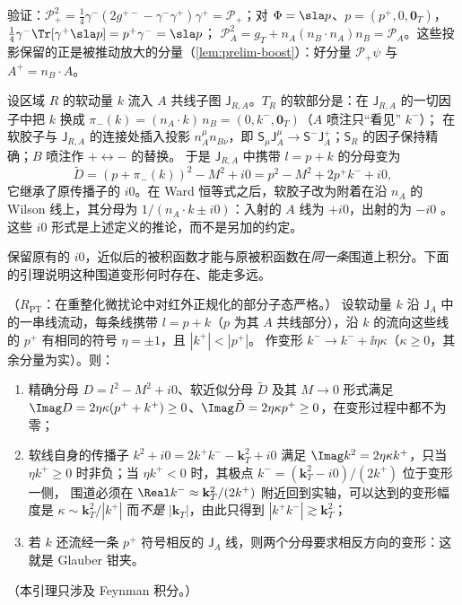 验证：$\mathcal P_+^2=\frac14\gamma^-(2g^{+-}-\gamma^-\gamma^+)\gamma^+=\mathcal P_+$；对 $\Phi=\sla p$、$p=(p^+,0,\mathbf 0_T)$，$\frac14\gamma^-\Tr[\gamma^+\sla p]=p^+\gamma^-=\sla p$；
$\mathcal P_A^2=g_T+n_A(n_B\cdot n_A)n_B=\mathcal P_A$。这些投影保留的正是被推动放大的分量（\cref{lem:prelim-boost}）：好分量 $\mathcal P_+\psi$ 与 $A^+=n_B\cdot A$。

\begin{definition}\label{def:method-soft-approx}
设区域 $R$ 的软动量 $k$ 流入 $A$ 共线子图 $\mathsf J_{R,A}$。$T_R$ 的软部分是：在 $\mathsf J_{R,A}$ 的一切因子中把 $k$ 换成 $\pi_-(k)=(n_A\cdot k)\,n_B=(0,k^-,\mathbf 0_T)$（$A$ 喷注只“看见” $k^-$）；
在软胶子与 $\mathsf J_{R,A}$ 的连接处插入投影 $n_A^\mu n_{B\nu}$，即 $\mathsf S_\mu\mathsf J_A^\mu\to\mathsf S^-\mathsf J_A^+$；$\mathsf S_R$ 的因子保持精确；$B$ 喷注作 $+\leftrightarrow-$ 的替换。
于是 $\mathsf J_{R,A}$ 中携带 $l=p+k$ 的分母变为
\begin{equation}\label{eq:method-Dtilde}
\tilde D=(p+\pi_-(k))^2-M^2+i0=p^2-M^2+2p^+k^-+i0 ,
\end{equation}
它继承了原传播子的 $i0$。在 Ward 恒等式之后，软胶子改为附着在沿 $n_A$ 的 Wilson 线上，其分母为 $1/(n_A\cdot k\pm i0)$：入射的 $A$ 线为 $+i0$，出射的为 $-i0$
。这些 $i0$ 形式是上述定义的推论，而不是另加的约定。%
\end{definition}

保留原有的 $i0$，近似后的被积函数才能与原被积函数在\emph{同一条}围道上积分。下面的引理说明这种围道变形何时存在、能走多远。

\begin{lemma}\label{lem:method-i0-compat}
（$R_{\mathrm{PT}}$：在重整化微扰论中对红外正规化的部分子态严格。）
设软动量 $k$ 沿 $\mathsf J_A$ 中的一串线流动，每条线携带 $l=p+k$（$p$ 为其 $A$ 共线部分），沿 $k$ 的流向这些线的 $p^+$ 有相同的符号 $\eta=\pm1$，且 $|k^+|<|p^+|$。
作变形 $k^-\to k^-+\ii\eta\kappa$（$\kappa\ge0$，其余分量为实）。则：
\begin{enumerate}[label=(\alph*),leftmargin=2em,itemsep=1pt,topsep=2pt]
\item 精确分母 $D=l^2-M^2+i0$、软近似分母 $\tilde D$ 及其 $M\to0$ 形式满足 $\Imag D=2\eta\kappa(p^++k^+)\ge0$、$\Imag\tilde D=2\eta\kappa p^+\ge0$，在变形过程中都不为零；
\item 软线自身的传播子 $k^2+i0=2k^+k^--\mathbf k_T^2+i0$ 满足 $\Imag k^2=2\eta\kappa k^+$，只当 $\eta k^+\ge0$ 时非负；当 $\eta k^+<0$ 时，其极点 $k^-=(\mathbf k_T^2-i0)/(2k^+)$ 位于变形一侧，
  围道必须在 $\Real k^-\approx\mathbf k_T^2/(2k^+)$ 附近回到实轴，可以达到的变形幅度是 $\kappa\sim\mathbf k_T^2/|k^+|$ 而\emph{不是} $|\mathbf k_T|$，由此只得到 $|k^+k^-|\gtrsim\mathbf k_T^2$；
\item 若 $k$ 还流经一条 $p^+$ 符号相反的 $\mathsf J_A$ 线，则两个分母要求相反方向的变形：这就是 Glauber 钳夹。
\end{enumerate}
（本引理只涉及 Feynman 积分。）
\end{lemma}

